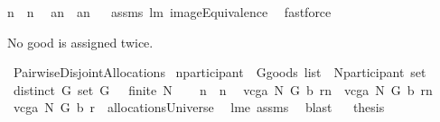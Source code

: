 \begin{isabellebody}
{\isachardoublequoteopen}n{}\ {\isasymnoteq}\ n{}{\isachardoublequoteclose}\ \isanewline
{}\ {\isachardoublequoteopen}a{\isacharcomma}{\isacharcomma}{\isacharcomma}n{}\ {\isasyminter}\ a{\isacharcomma}{\isacharcomma}{\isacharcomma}n{}{\isacharequal}{\isacharbraceleft}{\isacharbraceright}{\isachardoublequoteclose}%
\isadelimproof
\ %
\endisadelimproof
%
\isatagproof
{}\isamarkupfalse%
\ assms\ lm{}{}\ imageEquivalence\ \isamarkupfalse%
\ fastforce%
\endisatagproof
{\isafoldproof}%
%
\isadelimproof
%
\endisadelimproof
%
\begin{isamarkuptext}%
No good is assigned twice.%
\end{isamarkuptext}%
\isamarkuptrue%
\isamarkupfalse%
\ PairwiseDisjointAllocations{\isacharcolon}\isanewline
{}\ n{}{\isacharcolon}{\isacharcolon}{\isachardoublequoteopen}participant{\isachardoublequoteclose}\ \ G{\isacharcolon}{\isacharcolon}{\isachardoublequoteopen}goods\ list{\isachardoublequoteclose}\ \ N{\isacharcolon}{\isacharcolon}{\isachardoublequoteopen}participant\ set{\isachardoublequoteclose}\isanewline
{}\ {\isachardoublequoteopen}distinct\ G{\isachardoublequoteclose}\ {\isachardoublequoteopen}set\ G\ {\isasymnoteq}\ {\isacharbraceleft}{\isacharbraceright}{\isachardoublequoteclose}\ {\isachardoublequoteopen}finite\ N{\isachardoublequoteclose}\ \ \isanewline
\ \isanewline
{\isachardoublequoteopen}n{}\ {\isasymnoteq}\ n{}{\isachardoublequoteclose}\ \isanewline
{}\ {\isachardoublequoteopen}{\isacharparenleft}vcga{\isacharprime}\ N\ G\ b\ r{\isacharparenright}{\isacharcomma}{\isacharcomma}{\isacharcomma}n{}\ {\isasyminter}\ {\isacharparenleft}vcga{\isacharprime}\ N\ G\ b\ r{\isacharparenright}{\isacharcomma}{\isacharcomma}{\isacharcomma}n{}{\isacharequal}{\isacharbraceleft}{\isacharbraceright}{\isachardoublequoteclose}\ \ \isanewline
%
\isadelimproof
%
\endisadelimproof
%
\isatagproof
{}\isamarkupfalse%
\ {\isacharminus}\isanewline
{}\isamarkupfalse%
\ {\isachardoublequoteopen}vcga{\isacharprime}\ N\ G\ b\ r\ {\isasymin}\ allocationsUniverse{\isachardoublequoteclose}\ \isamarkupfalse%
\ lm{}{}e\ assms\ \isamarkupfalse%
\ blast\isanewline
{}\isamarkupfalse%
\ \isamarkupfalse%
\ {\isacharquery}thesis\ \isamarkupfalse%

\end{isabellebody}
